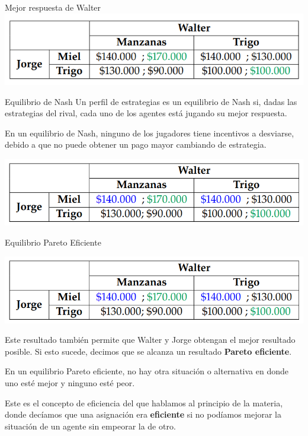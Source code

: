 \documentclass{beamer}
\begin{document}
\begin{frame}{Mejor respuesta de Walter}
    \centering
    \includegraphics[scale=0.6]{../Figures/T20.4.png}
\end{frame}

\begin{frame}{Equilibrio de Nash}
    Un perfil de estrategias es un equilibrio de Nash si, dadas las estrategias del rival, cada uno de los agentes está jugando su mejor respuesta.
    \begin{boxA}
        \centering
        En un equilibrio de Nash, ninguno de los jugadores tiene incentivos a desviarse, debido a que no puede obtener un pago mayor cambiando de estrategia.
    \end{boxA}
    \centering
    \includegraphics[scale=0.6]{../Figures/T20.5.png}
\end{frame}

\begin{frame}{Equilibrio Pareto Eficiente}
    \begin{center}
        \includegraphics[scale=0.6]{../Figures/T20.5.png}
    \end{center}
    Este resultado también permite que Walter y Jorge obtengan el mejor resultado posible. Si esto sucede, decimos que se alcanza un resultado \textbf{Pareto eficiente}.
    \begin{boxA}
        \centering
        En un equilibrio Pareto eficiente, no hay otra situación o alternativa en donde uno esté mejor y ninguno esté peor. 
    \end{boxA}
    Este es el concepto de eficiencia del que hablamos al principio de la materia, donde decíamos que una asignación era \textbf{eficiente} si no podíamos mejorar la situación de un agente sin empeorar la de otro.
\end{frame}
\end{document}
